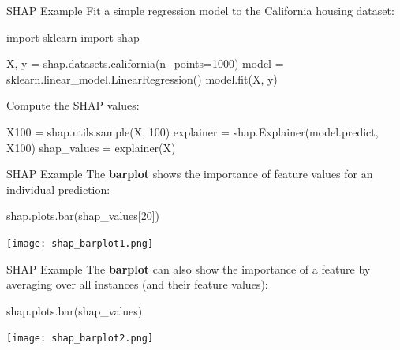 \documentclass[ignorenonframetext,xcolor=x11names]{beamer}
\begin{document}


\begin{frame}[fragile]{SHAP Example}
Fit a simple regression model to the California housing dataset:
\begin{pythoncode}
import sklearn
import shap

X, y = shap.datasets.california(n_points=1000)
model = sklearn.linear_model.LinearRegression()
model.fit(X, y)
\end{pythoncode}
Compute the SHAP values:
\begin{pythoncode}
X100 = shap.utils.sample(X, 100)
explainer = shap.Explainer(model.predict, X100)
shap_values = explainer(X)
\end{pythoncode}
\end{frame}

\begin{frame}[fragile]{SHAP Example}
The \textbf{barplot} shows the importance of feature values for an individual prediction:
\begin{pythoncode}
shap.plots.bar(shap_values[20])
\end{pythoncode}
\begin{center}
\texttt{[image: shap\_barplot1.png]}
\end{center}
\end{frame}

\begin{frame}[fragile]{SHAP Example}
The \textbf{barplot} can also show the importance of a feature by averaging over all instances (and their feature values):
\begin{pythoncode}
shap.plots.bar(shap_values)
\end{pythoncode}
\begin{center}
\texttt{[image: shap\_barplot2.png]}
\end{center}
\end{frame}
\end{document}

